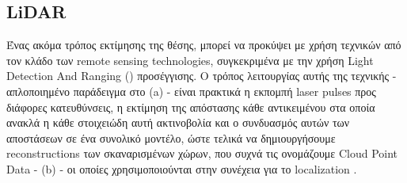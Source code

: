 

\subsection{LiDAR} \label{sec:related-lidar}
Ένας ακόμα τρόπος εκτίμησης της θέσης, μπορεί να προκύψει με χρήση τεχνικών από τον κλάδο των  
remote sensing technologies, συγκεκριμένα με την χρήση Light Detection And Ranging () προσέγγισης. Ο τρόπος λειτουργίας αυτής της τεχνικής - απλοποιημένο παράδειγμα στο  (a) - είναι πρακτικά η εκπομπή laser pulses προς διάφορες κατευθύνσεις, η εκτίμηση της απόστασης κάθε αντικειμένου στα οποία ανακλά η κάθε στοιχειώδη αυτή ακτινοβολία και ο συνδυασμός αυτών των αποστάσεων σε ένα συνολικό μοντέλο, ώστε τελικά να δημιουργήσουμε  reconstructions των σκαναρισμένων χώρων, που συχνά τις ονομάζουμε  Cloud Point Data -  (b) -  οι οποίες χρησιμοποιούνται στην συνέχεια για το localization \cite{lidar-basics}.






